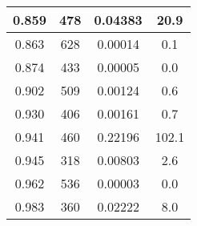 \begin{longtable}{c | c | c | c}
0.859 &  478 & 0.04383 & 20.9 \\ \hline 
0.863 &  628 & 0.00014 &  0.1 \\ \hline 
0.874 &  433 & 0.00005 &  0.0 \\ \hline 
0.902 &  509 & 0.00124 &  0.6 \\ \hline 
0.930 &  406 & 0.00161 &  0.7 \\ \hline 
0.941 &  460 & 0.22196 & 102.1 \\ \hline 
0.945 &  318 & 0.00803 &  2.6 \\ \hline 
0.962 &  536 & 0.00003 &  0.0 \\ \hline 
0.983 &  360 & 0.02222 &  8.0 \\ \hline 
\end{longtable}
